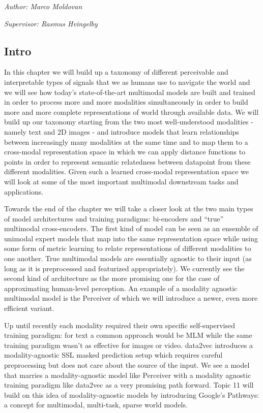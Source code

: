 \documentclass[
]{krantz}
\begin{document}
\emph{Author: Marco Moldovan}

\emph{Supervisor: Rasmus Hvingelby}

\hypertarget{intro-1}{%
\subsection{Intro}\label{intro-1}}

In this chapter we will build up a taxonomy of different perceivable and interpretable types of signals that we as humans use to navigate the world and we will see how today's state-of-the-art multimodal models are built and trained in order to process more and more modalities simultaneously in order to build more and more complete representations of world through available data. We will build up our taxonomy starting from the two most well-understood modalities - namely text and 2D images - and introduce models that learn relationships between increasingly many modalities at the same time and to map them to a cross-modal representation space in which we can apply distance functions to points in order to represent semantic relatedness between datapoint from these different modalities.
Given such a learned cross-modal representation space we will look at some of the most important multimodal downstream tasks and applications.

Towards the end of the chapter we will take a closer look at the two main types of model architectures and training paradigms: bi-encoders and ``true'' multimodal cross-encoders. The first kind of model can be seen as an ensemble of unimodal expert models that map into the same representation space while using some form of metric learning to relate representations of different modalities to one another. True multimodal models are essentially agnostic to their input (as long as it is preprocessed and featurized appropriately). We currently see the second kind of architecture as the more promising one for the case of approximating human-level perception. An example of a modality agnostic multimodal model is the Perceiver of which we will introduce a newer, even more efficient variant.

Up until recently each modality required their own specific self-supervised training paradigm: for text a common approach would be MLM while the same training paradigm wasn't as effective for images or video. data2vec introduces a modality-agnostic SSL masked prediction setup which requires careful preprocessing but does not care about the source of the input. We see a model that marries a modality-agnostic model like Perceiver with a modality agnostic training paradigm like data2vec as a very promising path forward.
Topic 11 will build on this idea of modality-agnostic models by introducing Google's Pathways: a concept for multimodal, multi-task, sparse world models.
\end{document}
